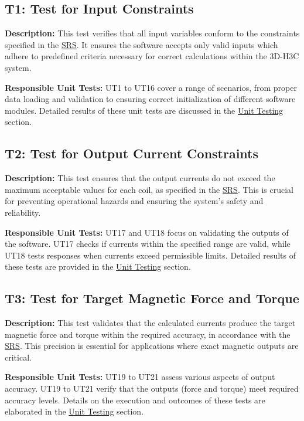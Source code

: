 \documentclass[12pt, titlepage]{article}
\begin{document}
\subsection{T1: Test for Input Constraints}
\textbf{Description:} This test verifies that all input variables conform to the constraints specified in the \href{https://github.com/rnorouziani/3D-H3C/blob/main/docs/SRS/SRS.pdf}{SRS}. It ensures the software accepts only valid inputs which adhere to predefined criteria necessary for correct calculations within the 3D-H3C system.

\textbf{Responsible Unit Tests:} UT1 to UT16 cover a range of scenarios, from proper data loading and validation to ensuring correct initialization of different software modules. Detailed results of these unit tests are discussed in the \hyperref[sec:UT]{Unit Testing} section.

\subsection{T2: Test for Output Current Constraints}
\textbf{Description:} This test ensures that the output currents do not exceed the maximum acceptable values for each coil, as specified in the \href{https://github.com/rnorouziani/3D-H3C/blob/main/docs/SRS/SRS.pdf}{SRS}. This is crucial for preventing operational hazards and ensuring the system's safety and reliability.

\textbf{Responsible Unit Tests:} UT17 and UT18 focus on validating the outputs of the software. UT17 checks if currents within the specified range are valid, while UT18 tests responses when currents exceed permissible limits. Detailed results of these tests are provided in the \hyperref[sec:UT]{Unit Testing} section.

\subsection{T3: Test for Target Magnetic Force and Torque}
\textbf{Description:} This test validates that the calculated currents produce the target magnetic force and torque within the required accuracy, in accordance with the \href{https://github.com/rnorouziani/3D-H3C/blob/main/docs/SRS/SRS.pdf}{SRS}. This precision is essential for applications where exact magnetic outputs are critical.

\textbf{Responsible Unit Tests:} UT19 to UT21 assess various aspects of output accuracy. UT19 to UT21 verify that the outputs (force and torque) meet required accuracy levels. Details on the execution and outcomes of these tests are elaborated in the \hyperref[sec:UT]{Unit Testing} section.
\end{document}
